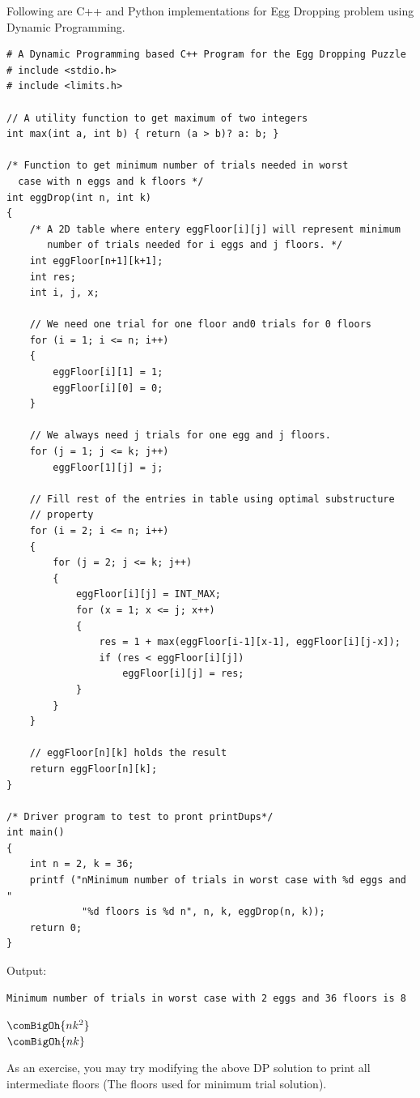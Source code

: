 
Following are C++ and Python implementations for Egg Dropping problem using
Dynamic Programming.
\begin{lstlisting}[style=raycppnewsnippet]
# A Dynamic Programming based C++ Program for the Egg Dropping Puzzle
# include <stdio.h>
# include <limits.h>
 
// A utility function to get maximum of two integers
int max(int a, int b) { return (a > b)? a: b; }
 
/* Function to get minimum number of trials needed in worst
  case with n eggs and k floors */
int eggDrop(int n, int k)
{
    /* A 2D table where entery eggFloor[i][j] will represent minimum
       number of trials needed for i eggs and j floors. */
    int eggFloor[n+1][k+1];
    int res;
    int i, j, x;
 
    // We need one trial for one floor and0 trials for 0 floors
    for (i = 1; i <= n; i++)
    {
        eggFloor[i][1] = 1;
        eggFloor[i][0] = 0;
    }
 
    // We always need j trials for one egg and j floors.
    for (j = 1; j <= k; j++)
        eggFloor[1][j] = j;

    // Fill rest of the entries in table using optimal substructure
    // property
    for (i = 2; i <= n; i++)
    {
        for (j = 2; j <= k; j++)
        {
            eggFloor[i][j] = INT_MAX;
            for (x = 1; x <= j; x++)
            {
                res = 1 + max(eggFloor[i-1][x-1], eggFloor[i][j-x]);
                if (res < eggFloor[i][j])
                    eggFloor[i][j] = res;
            }
        }
    }
 
    // eggFloor[n][k] holds the result
    return eggFloor[n][k];
}
 
/* Driver program to test to pront printDups*/
int main()
{
    int n = 2, k = 36;
    printf ("nMinimum number of trials in worst case with %d eggs and "
             "%d floors is %d n", n, k, eggDrop(n, k));
    return 0;
}
\end{lstlisting}
Output:
\begin{lstlisting}[style=rayio]
Minimum number of trials in worst case with 2 eggs and 36 floors is 8
\end{lstlisting}
 $\comBigOh{nk^2}$\\
 $\comBigOh{nk}$

As an exercise, you may try modifying the above DP solution to print all
intermediate floors (The floors used for minimum trial solution).

